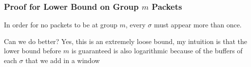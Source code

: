 \documentclass{beamer}
\begin{document}
\begin{frame}
  \frametitle{Proof for Lower Bound on Group $m$ Packets}
  In order for no packets to be at group $m$, every $\sigma$ must appear more than once. \\


   {Can we do better?  Yes, this is an extremely loose bound, my intuition is that the lower bound before $m$ is guaranteed is also logarithmic because of the buffers of each $\sigma$ that we add in a window}
\end{frame}
\end{document}
